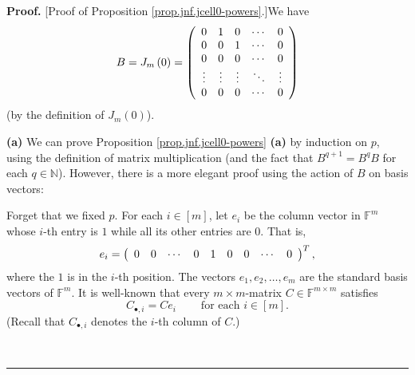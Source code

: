 \documentclass[numbers=enddot,12pt,final,onecolumn,notitlepage]{scrartcl}%
\numberwithin{exer}{subsection}
\theoremstyle{definition}
\newenvironment{proof}[1][Proof]{\noindent\textbf{#1.} }{\ \rule{0.5em}{0.5em}}
\begin{document}
\begin{proof}
[Proof of Proposition \ref{prop.jnf.jcell0-powers}.]We have%
\begin{equation}
B=J_{m}\left(  0\right)  =\left(
\begin{array}
[c]{ccccc}%
0 & 1 & 0 & \cdots & 0\\
0 & 0 & 1 & \cdots & 0\\
0 & 0 & 0 & \cdots & 0\\
\vdots & \vdots & \vdots & \ddots & \vdots\\
0 & 0 & 0 & \cdots & 0
\end{array}
\right)  \label{pf.prop.jnf.jcell0-powers.B=}%
\end{equation}
(by the definition of $J_{m}\left(  0\right)  $). \medskip

\textbf{(a)} We can prove Proposition \ref{prop.jnf.jcell0-powers}
\textbf{(a)} by induction on $p$, using the definition of matrix
multiplication (and the fact that $B^{q+1}=B^{q}B$ for each $q\in\mathbb{N}$).
However, there is a more elegant proof using the action of $B$ on basis
vectors: \medskip

Forget that we fixed $p$. For each $i\in\left[  m\right]  $, let $e_{i}$ be
the column vector in $\mathbb{F}^{m}$ whose $i$-th entry is $1$ while all its
other entries are $0$. That is,
\[
e_{i}=\left(
\begin{array}
[c]{ccccccccc}%
0 & 0 & \cdots & 0 & 1 & 0 & 0 & \cdots & 0
\end{array}
\right)  ^{T},
\]
where the $1$ is in the $i$-th position. The vectors $e_{1},e_{2},\ldots
,e_{m}$ are the standard basis vectors of $\mathbb{F}^{m}$. It is well-known
that every $m\times m$-matrix $C\in\mathbb{F}^{m\times m}$ satisfies%
\begin{equation}
C_{\bullet,i}=Ce_{i}\ \ \ \ \ \ \ \ \ \ \text{for each }i\in\left[  m\right]
. \label{pf.prop.jnf.jcell0-powers.a.coli}%
\end{equation}
(Recall that $C_{\bullet,i}$ denotes the $i$-th column of $C$.)


\end{proof}
\end{document}
